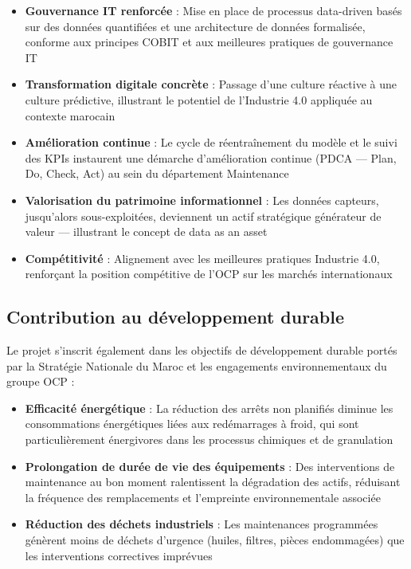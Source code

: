 \documentclass[a4paper,12pt]{report}
\begin{document}
\begin{itemize}
    \item \textbf{Gouvernance IT renforcée} : Mise en place de processus data-driven basés sur des données quantifiées et une architecture de données formalisée, conforme aux principes COBIT et aux meilleures pratiques de gouvernance IT
    
    \item \textbf{Transformation digitale concrète} : Passage d'une culture réactive à une culture prédictive, illustrant le potentiel de l'Industrie 4.0 appliquée au contexte marocain
    
    \item \textbf{Amélioration continue} : Le cycle de réentraînement du modèle et le suivi des KPIs instaurent une démarche d'amélioration continue (PDCA — Plan, Do, Check, Act) au sein du département Maintenance
    
    \item \textbf{Valorisation du patrimoine informationnel} : Les données capteurs, jusqu'alors sous-exploitées, deviennent un actif stratégique générateur de valeur — illustrant le concept de data as an asset
    
    \item \textbf{Compétitivité} : Alignement avec les meilleures pratiques Industrie 4.0, renforçant la position compétitive de l'OCP sur les marchés internationaux
\end{itemize}

\subsection{Contribution au développement durable}

Le projet s'inscrit également dans les objectifs de développement durable portés par la Stratégie Nationale du Maroc et les engagements environnementaux du groupe OCP :

\begin{itemize}
    \item \textbf{Efficacité énergétique} : La réduction des arrêts non planifiés diminue les consommations énergétiques liées aux redémarrages à froid, qui sont particulièrement énergivores dans les processus chimiques et de granulation
    \item \textbf{Prolongation de durée de vie des équipements} : Des interventions de maintenance au bon moment ralentissent la dégradation des actifs, réduisant la fréquence des remplacements et l'empreinte environnementale associée
    \item \textbf{Réduction des déchets industriels} : Les maintenances programmées génèrent moins de déchets d'urgence (huiles, filtres, pièces endommagées) que les interventions correctives imprévues
\end{itemize}
\end{document}
